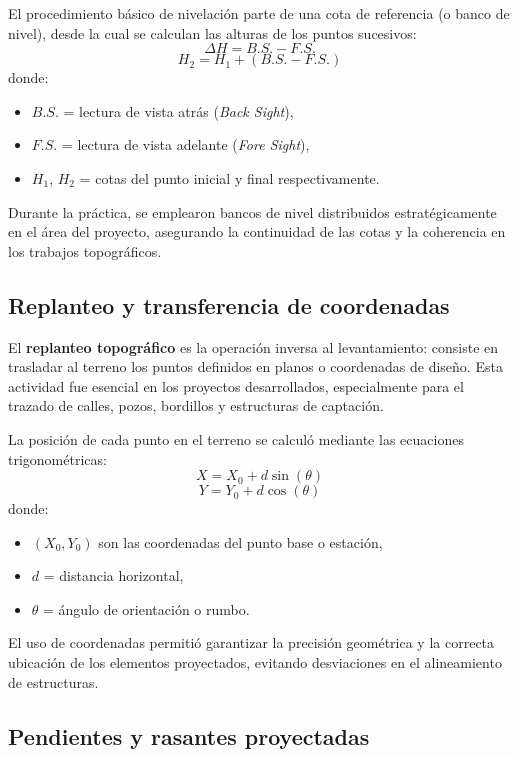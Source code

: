 \documentclass[12pt]{article}
\begin{document}
	El procedimiento básico de nivelación parte de una cota de referencia (o banco de nivel), desde la cual se calculan las alturas de los puntos sucesivos:
	\[
	\Delta H = B.S. - F.S.
	\]
	\[
	H_2 = H_1 + (B.S. - F.S.)
	\]
	donde:
	\begin{itemize}
		\item $B.S.$ = lectura de vista atrás (\textit{Back Sight}),
		\item $F.S.$ = lectura de vista adelante (\textit{Fore Sight}),
		\item $H_1$, $H_2$ = cotas del punto inicial y final respectivamente.
	\end{itemize}
	
	Durante la práctica, se emplearon bancos de nivel distribuidos estratégicamente en el área del proyecto, asegurando la continuidad de las cotas y la coherencia en los trabajos topográficos.
	
	\subsection{Replanteo y transferencia de coordenadas}
	
	El \textbf{replanteo topográfico} es la operación inversa al levantamiento: consiste en trasladar al terreno los puntos definidos en planos o coordenadas de diseño.  
	Esta actividad fue esencial en los proyectos desarrollados, especialmente para el trazado de calles, pozos, bordillos y estructuras de captación.
	
	La posición de cada punto en el terreno se calculó mediante las ecuaciones trigonométricas:
	\[
	X = X_0 + d \sin(\theta)
	\]
	\[
	Y = Y_0 + d \cos(\theta)
	\]
	donde:
	\begin{itemize}
		\item $(X_0, Y_0)$ son las coordenadas del punto base o estación,
		\item $d$ = distancia horizontal,
		\item $\theta$ = ángulo de orientación o rumbo.
	\end{itemize}
	
	El uso de coordenadas permitió garantizar la precisión geométrica y la correcta ubicación de los elementos proyectados, evitando desviaciones en el alineamiento de estructuras.
	
	\subsection{Pendientes y rasantes proyectadas}
	
\end{document}
